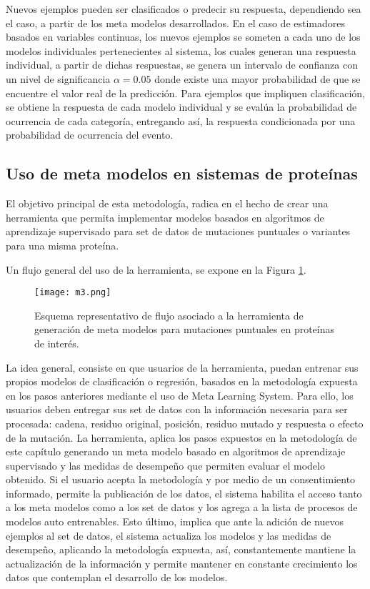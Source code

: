 Nuevos ejemplos pueden ser clasificados o predecir su respuesta, dependiendo sea el caso, a partir de los meta modelos desarrollados. En el caso de estimadores basados en variables continuas, los nuevos ejemplos se someten a cada uno de los modelos individuales pertenecientes al sistema, los cuales generan una respuesta individual, a partir de dichas respuestas, se genera un intervalo de confianza con un nivel de significancia $\alpha=0.05$ donde existe una mayor probabilidad de que se encuentre el valor real de la predicción. Para ejemplos que impliquen clasificación, se obtiene la respuesta de cada modelo individual y se evalúa la probabilidad de ocurrencia de cada categoría, entregando así, la respuesta condicionada por una probabilidad de ocurrencia del evento.

\subsection{Uso de meta modelos en sistemas de proteínas}

El objetivo principal de esta metodología, radica en el hecho de crear una herramienta que permita implementar modelos basados en algoritmos de aprendizaje supervisado para set de datos de mutaciones puntuales o variantes para una misma proteína. 

Un flujo general del uso de la herramienta, se expone en la Figura \ref{C2:M3}.

\begin{figure}[!h]
	\centering
	\texttt{[image: m3.png]}
	\caption{Esquema representativo de flujo asociado a la herramienta de generación de meta modelos para mutaciones puntuales en proteínas de interés.}
	\label{C2:M3}
\end{figure}

La idea general, consiste en que usuarios de la herramienta, puedan entrenar sus propios modelos de clasificación o regresión, basados en la metodología expuesta en los pasos anteriores mediante el uso de Meta Learning System. Para ello, los usuarios deben entregar sus set de datos con la información necesaria para ser procesada: cadena, residuo original, posición, residuo mutado y respuesta o efecto de la mutación. La herramienta, aplica los pasos expuestos en la metodología de este capítulo generando un meta modelo basado en algoritmos de aprendizaje supervisado y las medidas de desempeño que permiten evaluar el modelo obtenido. Si el usuario acepta la metodología y por medio de un consentimiento informado, permite la publicación de los datos, el sistema habilita el acceso tanto a los meta modelos como a los set de datos y los agrega a la lista de procesos de modelos auto entrenables. Esto último, implica que ante la adición de nuevos ejemplos al set de datos, el sistema actualiza los modelos y las medidas de desempeño, aplicando la metodología expuesta, así, constantemente mantiene la actualización de la información y permite mantener en constante crecimiento los datos que contemplan el desarrollo de los modelos.
 
